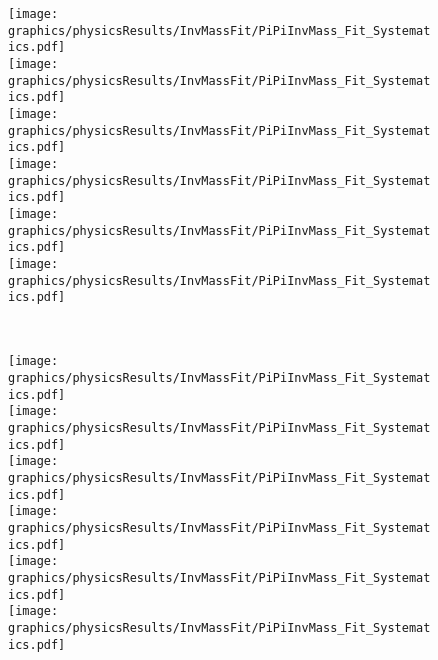 \begin{figure}[hb]%
\ContinuedFloat
\centering
\parbox{0.495\textwidth}{
  \centering
  \texttt{[image: graphics/physicsResults/InvMassFit/PiPiInvMass\_Fit\_Systematics.pdf]}\\
  \texttt{[image: graphics/physicsResults/InvMassFit/PiPiInvMass\_Fit\_Systematics.pdf]}\\
  \texttt{[image: graphics/physicsResults/InvMassFit/PiPiInvMass\_Fit\_Systematics.pdf]}\\
  \texttt{[image: graphics/physicsResults/InvMassFit/PiPiInvMass\_Fit\_Systematics.pdf]}\\
  \texttt{[image: graphics/physicsResults/InvMassFit/PiPiInvMass\_Fit\_Systematics.pdf]}\\
  \texttt{[image: graphics/physicsResults/InvMassFit/PiPiInvMass\_Fit\_Systematics.pdf]}
}~
\parbox{0.495\textwidth}{
  \centering
  \texttt{[image: graphics/physicsResults/InvMassFit/PiPiInvMass\_Fit\_Systematics.pdf]}\\
  \texttt{[image: graphics/physicsResults/InvMassFit/PiPiInvMass\_Fit\_Systematics.pdf]}\\
  \texttt{[image: graphics/physicsResults/InvMassFit/PiPiInvMass\_Fit\_Systematics.pdf]}\\
  \texttt{[image: graphics/physicsResults/InvMassFit/PiPiInvMass\_Fit\_Systematics.pdf]}\\
  \texttt{[image: graphics/physicsResults/InvMassFit/PiPiInvMass\_Fit\_Systematics.pdf]}\\
  \texttt{[image: graphics/physicsResults/InvMassFit/PiPiInvMass\_Fit\_Systematics.pdf]}
}%
\end{figure}%
